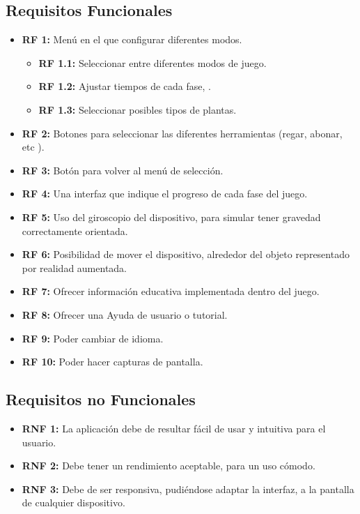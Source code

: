 \subsection{Requisitos Funcionales}
 \begin{itemize}
	\item \textbf{RF 1:} Menú en el que configurar diferentes modos.
	\begin{itemize}
	\item \textbf{RF 1.1:} Seleccionar entre diferentes modos de juego.
	\item \textbf{RF 1.2:} Ajustar tiempos de cada fase,  .
	\item \textbf{RF 1.3:} Seleccionar posibles tipos de plantas.	
	\end{itemize} 
	\item \textbf{RF 2:} Botones para seleccionar las diferentes herramientas (regar, abonar, etc ).
	\item \textbf{RF 3:} Botón para volver al menú de selección.
	\item \textbf{RF 4:} Una interfaz que indique el progreso de cada fase del juego.
	\item \textbf{RF 5:} Uso del giroscopio del dispositivo, para simular tener gravedad correctamente orientada.
	\item \textbf{RF 6:} Posibilidad de mover el dispositivo, alrededor del objeto representado por realidad aumentada.
	\item \textbf{RF 7:} Ofrecer información educativa implementada dentro del juego.
	\item \textbf{RF 8:} Ofrecer una Ayuda de usuario o tutorial.
	\item \textbf{RF 9:} Poder cambiar de idioma.
	\item \textbf{RF 10:} Poder hacer capturas de pantalla.
\end{itemize}
\subsection{Requisitos no Funcionales}
\begin{itemize}
	\item \textbf{RNF 1:} La aplicación debe de resultar fácil de usar y intuitiva para el usuario.
	\item \textbf{RNF 2:} Debe tener un rendimiento aceptable, para un uso cómodo.
	\item \textbf{RNF 3:} Debe de ser responsiva, pudiéndose adaptar la interfaz, a la pantalla de cualquier dispositivo.
\end{itemize}

